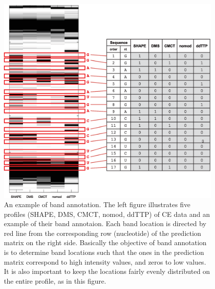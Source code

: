 \documentclass[letter]{bioinfo}
\begin{document}
\begin{figure}
\centering
\includegraphics[width=\linewidth]{figures/supp_band_annotation_example}
\caption{An example of band annotation. The left figure illustrates five profiles (SHAPE, DMS, CMCT, nomod, ddTTP) of CE data and an example of their band annotaion. Each band location is directed by red line from the corresponding row (nucleotide) of the prediction matrix on the right side. Basically the objective of band annotation is to determine band locations such that the ones in the prediction matrix correspond to high intensity values, and zeros to low values. It is also important to keep the locations fairly evenly distributed on the entire profile, as in this figure. }
\label{f:old_vs_new}
\end{figure}
\end{document}
